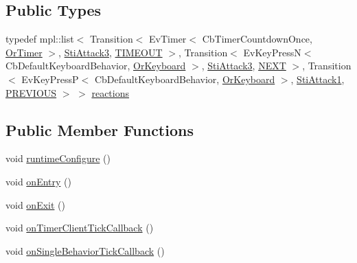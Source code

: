 \subsection*{Public Types}
\begin{DoxyCompactItemize}
\item 
typedef mpl\+::list$<$ Transition$<$ Ev\+Timer$<$ Cb\+Timer\+Countdown\+Once, \hyperlink{classsm__starcraft__ai_1_1OrTimer}{Or\+Timer} $>$, \hyperlink{structsm__starcraft__ai_1_1attack__inner__states_1_1StiAttack3}{Sti\+Attack3}, \hyperlink{structsm__starcraft__ai_1_1attack__inner__states_1_1StiAttack2_1_1TIMEOUT}{T\+I\+M\+E\+O\+UT} $>$, Transition$<$ Ev\+Key\+PressN$<$ Cb\+Default\+Keyboard\+Behavior, \hyperlink{classsm__starcraft__ai_1_1OrKeyboard}{Or\+Keyboard} $>$, \hyperlink{structsm__starcraft__ai_1_1attack__inner__states_1_1StiAttack3}{Sti\+Attack3}, \hyperlink{structsm__starcraft__ai_1_1attack__inner__states_1_1StiAttack2_1_1NEXT}{N\+E\+XT} $>$, Transition$<$ Ev\+Key\+PressP$<$ Cb\+Default\+Keyboard\+Behavior, \hyperlink{classsm__starcraft__ai_1_1OrKeyboard}{Or\+Keyboard} $>$, \hyperlink{structsm__starcraft__ai_1_1attack__inner__states_1_1StiAttack1}{Sti\+Attack1}, \hyperlink{structsm__starcraft__ai_1_1attack__inner__states_1_1StiAttack2_1_1PREVIOUS}{P\+R\+E\+V\+I\+O\+US} $>$ $>$ \hyperlink{structsm__starcraft__ai_1_1attack__inner__states_1_1StiAttack2_a978f087e297634bc2e93830ee485a799}{reactions}
\end{DoxyCompactItemize}
\subsection*{Public Member Functions}
\begin{DoxyCompactItemize}
\item 
void \hyperlink{structsm__starcraft__ai_1_1attack__inner__states_1_1StiAttack2_a301b74115e7af337d1f3883eb800a7a6}{runtime\+Configure} ()
\item 
void \hyperlink{structsm__starcraft__ai_1_1attack__inner__states_1_1StiAttack2_aaf86dde2442f2d91ffeae296f74c6120}{on\+Entry} ()
\item 
void \hyperlink{structsm__starcraft__ai_1_1attack__inner__states_1_1StiAttack2_a8d8c4c3b9e45a7dd8994bd22da3e2aaa}{on\+Exit} ()
\item 
void \hyperlink{structsm__starcraft__ai_1_1attack__inner__states_1_1StiAttack2_ab61b51291174e84b4ebf137101703e65}{on\+Timer\+Client\+Tick\+Callback} ()
\item 
void \hyperlink{structsm__starcraft__ai_1_1attack__inner__states_1_1StiAttack2_a3a78121d979d8bb7eb466707456a1aef}{on\+Single\+Behavior\+Tick\+Callback} ()
\end{DoxyCompactItemize}
